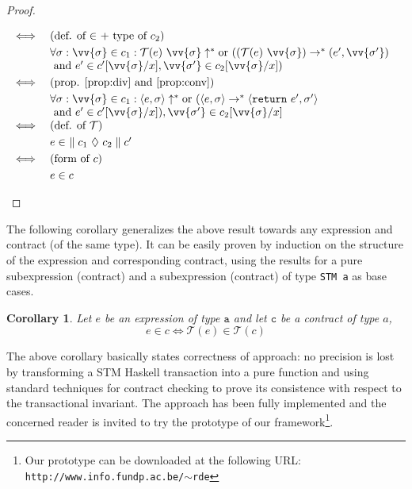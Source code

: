 \documentclass[submission,copyright,creativecommons]{eptcs}
\newcommand{\code}[1]{\textrm{{\tt #1}}}
\newcommand{\returnTMONLY}{\ensuremath{\code{return}}}
\newcommand{\returnTM}[1]{\ensuremath{\returnTMONLY \ #1}}
\newcommand{\pt}{\ensuremath{\mathcal{T}}}
\newtheorem{corollary}{Corollary}
\begin{document}
\begin{proof}
\begin{itemize}
\begin{math}
\begin{array}{ll}
      \iff & \mbox{(def. of $\in$ + type of $c_2$)} \smallskip\\
      & \forall \sigma : \vv{\sigma} \in c_1 : \divergespure{\pt(e) \ \vv{\sigma}} \mbox{or } 
                                                    ( (\pt(e) \ \vv{\sigma}) \rightarrow^{*} (e',\vv{\sigma'}) \\ & \mbox{ and } e' \in c'[\vv{\sigma}/x], \vv{\sigma'} \in c_2[\vv{\sigma}/x]) \smallskip\\
      \iff & \mbox{(prop. \eqref{prop:div} and \eqref{prop:conv})} \smallskip\\
      & \forall \sigma : \vv{\sigma} \in c_1 : \diverges{e,\sigma} \mbox{or } 
                                                    ( \cpl{e,\sigma} \rightarrow^{*} \cpl{\returnTM{e'},\sigma'} \\ & \mbox{ and } e' \in c'[\vv{\sigma}/x]), \vv{\sigma'} \in c_2[\vv{\sigma}/x] \\    
      \iff &  \mbox{(def. of $\pt$)} \smallskip\\
      & e \in \ \contractTM{c_1}{c_2}{c'} \smallskip\\                             
      \iff &  \mbox{(form of $c$)}\smallskip\\ 
      & e \in c                              
    \end{array}
  \end{math}
\end{itemize}
\end{proof}

The following corollary generalizes the above result towards any expression and contract (of the same type). It can be easily proven by induction on the structure of the expression and corresponding contract, using the results for a pure subexpression (contract) and a subexpression (contract) of type \texttt{STM a} as base cases.
\begin{corollary}
  Let $e$ be an expression of type $\mathtt{a}$ and let $\mathtt{c}$ be a contract of type $a$, 
  \[ e \in c \iff \pt(e) \in \pt(c) \]
\end{corollary}

The above corollary basically states correctness of approach: no precision is lost by transforming a STM Haskell transaction into a pure function and using standard techniques for contract checking \cite{static-contract-checking} to prove its consistence with respect to the transactional invariant. The approach has been fully implemented and the concerned reader is invited to try the prototype of our framework\footnote{Our prototype can be  downloaded at the following URL: \\ \texttt{http://www.info.fundp.ac.be/$\mathtt{\sim}$rde}}.   
\end{document}
